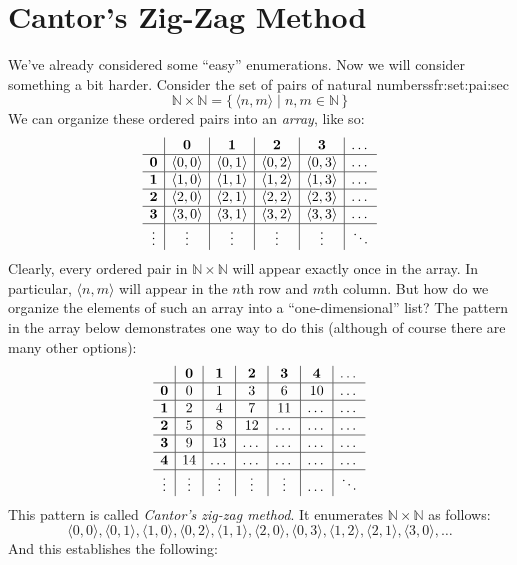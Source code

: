 \documentclass[10pt,a4paper]{article}
\makeatletter
\theoremstyle{plain}
\theoremstyle{definition}
\theoremstyle{remark}
\newenvironment{explain}{}{}
\newcommand*{\olfileid}[3]{}
\newcommand*{\olsection}[1]{\section*{#1}}
\newcommand{\olref}{\@ifnextchar[{\olref@i}{\olref@final}}
\def\olref@i[#1]{\@ifnextchar[{\olref@ii}{\olref@final}}
\def\olref@ii[#1]{\@ifnextchar[{\olref@iii}{\olref@final}}
\def\olref@iii[#1]{\olref@final}
\def\olref@final#1{\ref{#1}}
\providecommand{\tuple}[1]{\langle #1 \rangle}
\providecommand{\Nat}{\ensuremath{\mathbb{N}}}
\providecommand{\Setabs}[2]{\{\, #1 \mid #2 \,\}}
\providecommand{\oliflabeldef}[3]{#1}
\providecommand{\oliflabeldef}[2]{#1}
\makeatother
\begin{document}
\OLEndChapterHook





\olfileid{sfr}{siz}{zigzag}

\olsection{Cantor's Zig-Zag Method}

\begin{explain}
We've already considered some ``easy'' enumerations. Now we will
consider something a bit harder. Consider the set of pairs of natural
numbers\oliflabeldef{sfr:set:pai:sec}{, which we defined in
\olref[set][pai]{sec} thus:}{defined by:}
\[
\Nat \times \Nat = \Setabs{\tuple{n,m}}{n,m \in \Nat}
\]
We can organize these ordered pairs into an \emph{array}, like so:
\[
\begin{array}{ c | c | c | c | c | c}
& \mathbf 0 & \mathbf 1 & \mathbf 2 & \mathbf 3 & \dots \\
\hline
\mathbf 0 & \tuple{0,0} & \tuple{0,1} & \tuple{0,2} & \tuple{0,3} & \dots \\
\hline
\mathbf 1 & \tuple{1,0} & \tuple{1,1} & \tuple{1,2} & \tuple{1,3} & \dots \\
\hline
\mathbf 2 & \tuple{2,0} & \tuple{2,1} & \tuple{2,2} & \tuple{2,3} & \dots \\
\hline
\mathbf 3 & \tuple{3,0} & \tuple{3,1} & \tuple{3,2} & \tuple{3,3} & \dots \\
\hline
\vdots & \vdots & \vdots & \vdots & \vdots & \ddots\\
\end{array}
\]
Clearly, every ordered pair in $\Nat \times \Nat$ will appear
exactly once in the array. In particular, $\tuple{n,m}$ will appear in
the $n$th row and $m$th column. But how do we organize the elements of
such an array into a ``one-dimensional'' list? The pattern in the array below
demonstrates one way to do this (although of course there are many other options):
\[
\begin{array}{ c | c | c | c | c | c | c}
& \mathbf 0 & \mathbf 1 & \mathbf 2 & \mathbf 3 & \mathbf 4 &\dots \\
\hline
\mathbf 0 & 0  & 1& 3 & 6& 10 &\ldots \\
\hline
\mathbf 1 &2 & 4& 7 & 11 & \dots &\ldots \\
\hline
\mathbf 2 & 5 & 8 & 12 & \ldots & \dots&\ldots \\
\hline
\mathbf 3 & 9 & 13 & \ldots & \ldots & \dots & \ldots \\
\hline
\mathbf 4 & 14 & \ldots & \ldots & \ldots & \dots & \ldots \\
\hline
\vdots & \vdots & \vdots & \vdots & \vdots&\ldots & \ddots\\
\end{array}
\]\noindent
This pattern is called \emph{Cantor's zig-zag method}. It  enumerates
$\Nat \times \Nat$ as follows:
\[
\tuple{0,0}, \tuple{0,1}, \tuple{1,0}, \tuple{0,2}, \tuple{1,1},
\tuple{2,0}, \tuple{0,3}, \tuple{1,2}, \tuple{2,1}, \tuple{3,0}, \dots
\]
And this establishes the following:
\end{explain}
\end{document}
